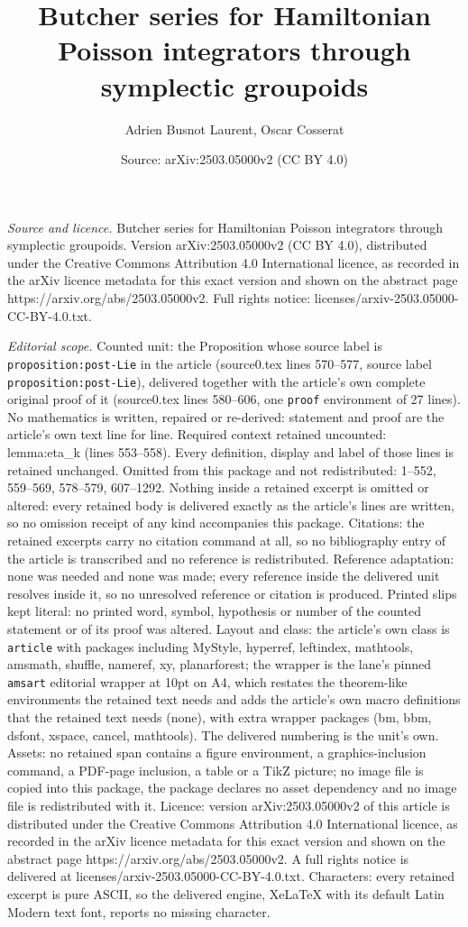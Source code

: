 \documentclass[10pt,a4paper]{amsart}
\title[Butcher series for Hamiltonian Poisson integrators through s]{Butcher series for Hamiltonian Poisson integrators through symplectic groupoids}
\author{Adrien Busnot Laurent, Oscar Cosserat}
\date{Source: arXiv:2503.05000v2 (CC BY 4.0)}
\begin{document}
\maketitle

\noindent\emph{Source and licence.} Butcher series for Hamiltonian Poisson integrators through symplectic groupoids. Version arXiv:2503.05000v2 (CC BY 4.0), distributed under the Creative Commons Attribution 4.0 International licence, as recorded in the arXiv licence metadata for this exact version and shown on the abstract page https://arxiv.org/abs/2503.05000v2. Full rights notice: licenses/arxiv-2503.05000-CC-BY-4.0.txt.\par\smallskip

\noindent\textit{Editorial scope.} Counted unit: the Proposition whose source label is \texttt{proposition:post-Lie} in the article (source0.tex lines 570--577, source label \texttt{proposition:post-Lie}), delivered together with the article's own complete original proof of it (source0.tex lines 580--606, one \texttt{proof} environment of 27 lines). No mathematics is written, repaired or re-derived: statement and proof are the article's own text line for line. Required context retained uncounted: lemma:eta\_k (lines 553--558). Every definition, display and label of those lines is retained unchanged. Omitted from this package and not redistributed: 1--552, 559--569, 578--579, 607--1292. Nothing inside a retained excerpt is omitted or altered: every retained body is delivered exactly as the article's lines are written, so no omission receipt of any kind accompanies this package. Citations: the retained excerpts carry no citation command at all, so no bibliography entry of the article is transcribed and no reference is redistributed. Reference adaptation: none was needed and none was made; every reference inside the delivered unit resolves inside it, so no unresolved reference or citation is produced. Printed slips kept literal: no printed word, symbol, hypothesis or number of the counted statement or of its proof was altered. Layout and class: the article's own class is \texttt{article} with packages including MyStyle, hyperref, leftindex, mathtools, amsmath, shuffle, nameref, xy, planarforest; the wrapper is the lane's pinned \texttt{amsart} editorial wrapper at 10pt on A4, which restates the theorem-like environments the retained text needs and adds the article's own macro definitions that the retained text needs (none), with extra wrapper packages (bm, bbm, dsfont, xspace, cancel, mathtools). The delivered numbering is the unit's own. Assets: no retained span contains a figure environment, a graphics-inclusion command, a PDF-page inclusion, a table or a TikZ picture; no image file is copied into this package, the package declares no asset dependency and no image file is redistributed with it. Licence: version arXiv:2503.05000v2 of this article is distributed under the Creative Commons Attribution 4.0 International licence, as recorded in the arXiv licence metadata for this exact version and shown on the abstract page https://arxiv.org/abs/2503.05000v2. A full rights notice is delivered at licenses/arxiv-2503.05000-CC-BY-4.0.txt. Characters: every retained excerpt is pure ASCII, so the delivered engine, XeLaTeX with its default Latin Modern text font, reports no missing character.
\end{document}
